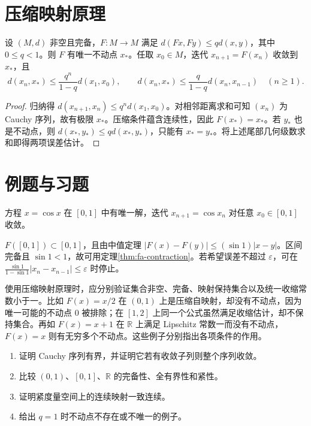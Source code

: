 \section{压缩映射原理}
\begin{theorem}\label{thm:fa-contraction}
设 $(M,d)$ 非空且完备，$F:M\to M$ 满足 $d(Fx,Fy)\leq qd(x,y)$，其中 $0\leq q<1$。则 $F$ 有唯一不动点 $x_*$。任取 $x_0\in M$，迭代 $x_{n+1}=F(x_n)$ 收敛到 $x_*$，且
\[
 d(x_n,x_*)\leq\frac{q^n}{1-q}d(x_1,x_0),\qquad
 d(x_n,x_*)\leq\frac{q}{1-q}d(x_n,x_{n-1})\quad(n\geq1).
\]
\end{theorem}
\begin{proof}
归纳得 $d(x_{n+1},x_n)\leq q^nd(x_1,x_0)$。对相邻距离求和可知 $(x_n)$ 为 Cauchy 序列，故有极限 $x_*$。压缩条件蕴含连续性，因此 $F(x_*)=x_*$。若 $y_*$ 也是不动点，则 $d(x_*,y_*)\leq qd(x_*,y_*)$，只能有 $x_*=y_*$。将上述尾部几何级数求和即得两项误差估计。
\end{proof}

\section{例题与习题}
\begin{example}
方程 $x=\cos x$ 在 $[0,1]$ 中有唯一解，迭代 $x_{n+1}=\cos x_n$ 对任意 $x_0\in[0,1]$ 收敛。
\end{example}
\begin{solve}
$F([0,1])\subset[0,1]$，且由中值定理 $|F(x)-F(y)|\leq(\sin1)|x-y|$。区间完备且 $\sin1<1$，故可用定理\ref{thm:fa-contraction}。若希望误差不超过 $\varepsilon$，可在 $\frac{\sin1}{1-\sin1}|x_n-x_{n-1}|\leq\varepsilon$ 时停止。
\end{solve}

使用压缩映射原理时，应分别验证集合非空、完备、映射保持集合以及统一收缩常数小于一。比如 $F(x)=x/2$ 在 $(0,1)$ 上是压缩自映射，却没有不动点，因为唯一可能的不动点 $0$ 被排除；在 $[1,2]$ 上同一个公式虽然满足收缩估计，却不保持集合。再如 $F(x)=x+1$ 在 $\mathbb R$ 上满足 Lipschitz 常数一而没有不动点，$F(x)=x$ 则有无穷多个不动点。这些例子分别指出各项条件的作用。
\begin{enumerate}
 \item\label{exer:fa-cauchy} 证明 Cauchy 序列有界，并证明它若有收敛子列则整个序列收敛。
 \item 比较 $(0,1)$、$[0,1]$、$\mathbb R$ 的完备性、全有界性和紧性。
 \item 证明紧度量空间上的连续映射一致连续。
 \item 给出 $q=1$ 时不动点不存在或不唯一的例子。
\end{enumerate}

